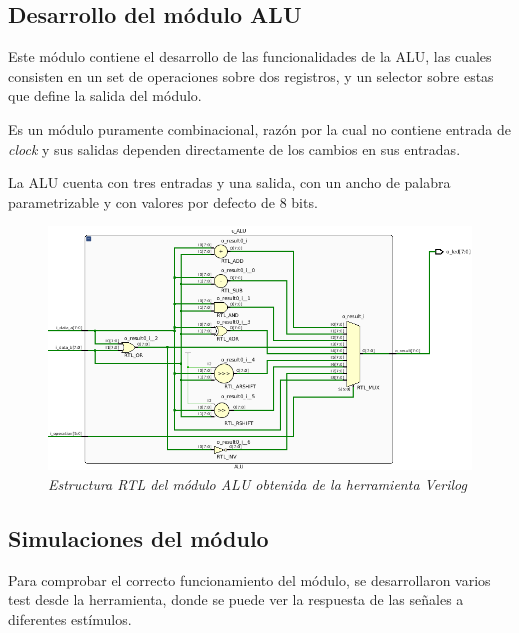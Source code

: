 \documentclass[12pt,A4paper,titlepage]{article}
\begin{document}
\subsection{Desarrollo del módulo ALU}
Este módulo contiene el desarrollo de las funcionalidades de la ALU, las cuales consisten en un set de operaciones sobre dos registros, y un selector sobre estas que define la salida del módulo.

Es un módulo puramente combinacional, razón por la cual no contiene entrada de \textit{clock} y sus salidas dependen directamente de los cambios en sus entradas. 


La ALU cuenta con tres entradas y una salida, con un ancho de palabra parametrizable y con valores por defecto de 8 bits. 

\begin{figure}[H] 
	\centering
	\includegraphics[scale=0.6]{figure/rtl-alu.png}
	\caption{\textit{Estructura RTL del módulo ALU obtenida de la herramienta Verilog}}
\end{figure}

\subsection{Simulaciones del módulo}
Para comprobar el correcto funcionamiento del módulo, se desarrollaron varios test desde la herramienta, donde se puede ver la respuesta de las señales a diferentes estímulos.
\end{document}

